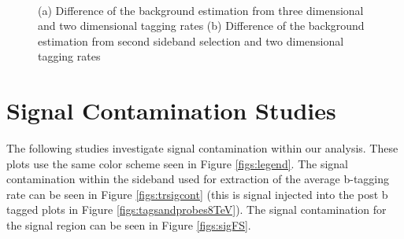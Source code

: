\begin{figure}[Htcb]
\begin{center}
\\
\caption{
(a) Difference of the background estimation from three dimensional and two dimensional tagging rates
(b) Difference of the background estimation from second sideband selection and two dimensional tagging rates
}
\label{figs:sb2comp}
\end{center}
\end{figure}


\section{Signal Contamination Studies}
\label{sec:sigcont}
The following studies investigate signal contamination within our analysis.  These plots use the same color scheme seen in Figure \ref{figs:legend}.  
The signal contamination within the sideband used for extraction of the average b-tagging rate can be seen in Figure \ref{figs:trsigcont} (this is signal injected 
into the post b tagged plots in Figure \ref{figs:tagsandprobes8TeV}).  The signal contamination for the signal region can be seen in Figure \ref{figs:sigFS}.

